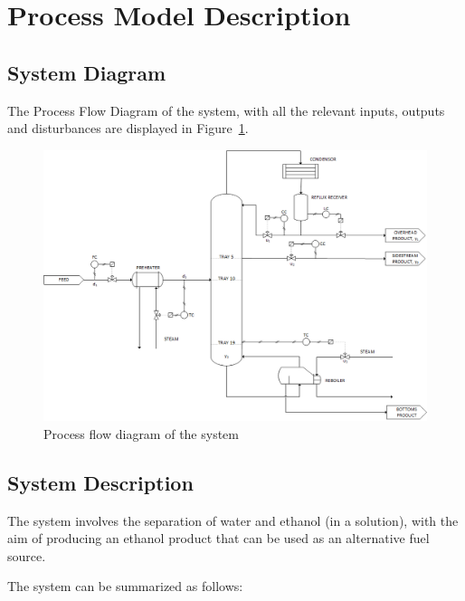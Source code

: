 \section{Process Model Description}
\label{sec:Process Model Description}
\subsection{System Diagram}

The Process Flow Diagram of the system, with all the relevant inputs, outputs and disturbances are displayed in Figure~\ref{fig:PFD}.

\begin{figure}[tbph]
	\centering
	\includegraphics[width=0.9\linewidth]{Figures/Process_PFD}
	\caption{Process flow diagram of the system}
	\label{fig:PFD}
\end{figure}


\subsection{System Description}

The system involves the separation of water and ethanol (in a solution), with the aim of producing an ethanol product that can be used as an alternative fuel source.

The system can be summarized as follows:

